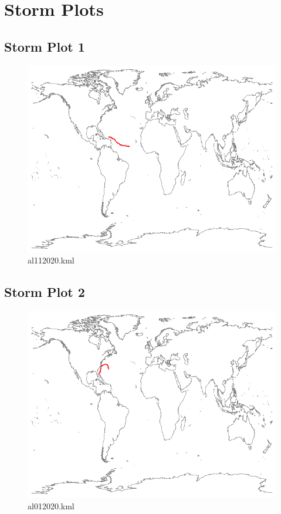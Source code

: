 \documentclass[]{article}
\begin{document}
\section{Storm Plots}
\subsection{Storm Plot 1}
\begin{figure}[htbp]
    \centering
\includegraphics{al112020.png}
\caption{al112020.kml}
\label{fig:al112020}
\end{figure}

\clearpage
\subsection{Storm Plot 2}

\begin{figure}[htbp]
    \centering
\includegraphics{al012020.png}
\caption{al012020.kml}
\label{fig:al012020}
\end{figure}
\end{document}
